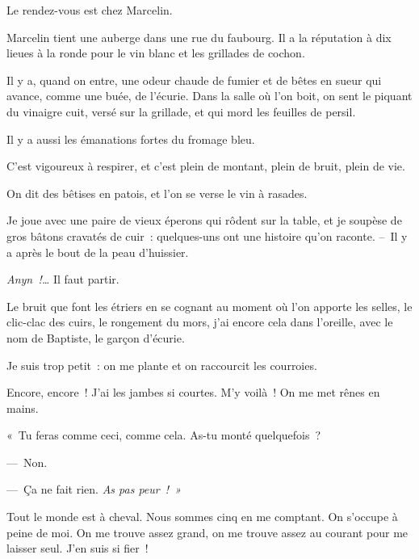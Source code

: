 \documentclass[french,twoside]{book} %
\def\mednobreak{\ifdim\lastskip<\medskipamount
  \removelastskip\nopagebreak\medskip\fi}
\newcommand{\labelblock}[1]{\medbreak{\noindent\color{rubric}\bfseries #1}\par\mednobreak}
\begin{document}
Le rendez-vous est chez Marcelin.\par
Marcelin tient une auberge dans une rue du faubourg. Il a la réputation à dix lieues à la ronde pour le vin blanc et les grillades de cochon.\par
Il y a, quand on entre, une odeur chaude de fumier et de bêtes en sueur qui avance, comme une buée, de l’écurie. Dans la salle où l’on boit, on sent le piquant du vinaigre cuit, versé sur la grillade, et qui mord les feuilles de persil.\par
Il y a aussi les émanations fortes du fromage bleu.\par
C’est vigoureux à respirer, et c’est plein de montant, plein de bruit, plein de vie.\par
On dit des bêtises en patois, et l’on se verse le vin à rasades.\par
Je joue avec une paire de vieux éperons qui rôdent sur la table, et je soupèse de gros bâtons cravatés de cuir : quelques-uns ont une histoire qu’on raconte. – Il y a après le bout de la peau d’huissier.\par
\emph{Anyn !…} Il faut partir.\par
Le bruit que font les étriers en se cognant au moment où l’on apporte les selles, le clic-clac des cuirs, le rongement du mors, j’ai encore cela dans l’oreille, avec le nom de Baptiste, le garçon d’écurie.\par
Je suis trop petit : on me plante et on raccourcit les courroies.\par
Encore, encore ! J’ai les jambes si courtes. M’y voilà ! On me met rênes en mains.\par
« Tu feras comme ceci, comme cela. As-tu monté quelquefois ?\par
— Non.\par
— Ça ne fait rien. \emph{As pas peur ! »}\par
Tout le monde est à cheval. Nous sommes cinq en me comptant. On s’occupe à peine de moi. On me trouve assez grand, on me trouve assez au courant pour me laisser seul. J’en suis si fier !\par

\labelblock{CHAUDEYROLLES}
\end{document}

